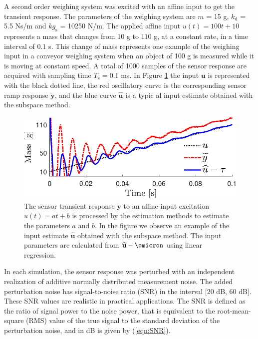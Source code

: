 A second order weighing system was excited with an affine input to get the transient response.
The parameters of the weighing system are $m$ = 15 g, $k_{\mathrm{d}}$ = 5.5 Ns/m and $kg_{\mathrm{s}}$ = 10250 N/m.
The applied affine input $u(t) = 100 t + 10$ represents a mass that changes from $10$ g to $110$ g, at a constant rate, in a time interval of $0.1$ s.
This change of mass represents one example of the weighing input in a conveyor weighing system when an object of 100 g is measured while it is moving at constant speed.
A total of 1000 samples of the sensor response are acquired with sampling time $T_s = 0.1$ ms.
In Figure \ref{fig:sensor_weight} the input $\mathbf{u}$ is represented with the black dotted line, the red oscillatory curve is the corresponding sensor ramp response $\widetilde{\mathbf{y}}$, and the blue curve $\widehat{\mathbf{u}}_{\mathrm{}}$ is a typic al input estimate obtained with the subspace method.


\begin{figure}[!htbp]
\centering
\includegraphics[width=0.69\columnwidth]{./ChapterRampInput/fig/Fig_2.pdf} 
\caption{ \label{fig:sensor_weight} The sensor transient response $\widetilde{\mathbf{y}}$ to an affine input excitation $u(t) = at+b$ is processed by the estimation methods to estimate the parameters $a$ and $b$. In the figure we observe an example of the input estimate $\widehat{\mathbf{u}}$ obtained with the subspace method. The input parameters are calculated from $\widehat{\mathbf{u}} - \omicron$ using linear regression.}
\end{figure}

In each simulation, the sensor response was perturbed with an independent realization of additive normally distributed measurement noise.
The added perturbation noise has signal-to-noise ratio (SNR) in the interval [20 dB, 60 dB].
These SNR values are realistic in practical applications.
The SNR is defined as the ratio of signal power to the noise power, that is equivalent to the root-mean-square (RMS) value of the true signal to the standard deviation of the perturbation noise, and in dB is given by \color{blue}(\ref{eqn:SNR})\color{black}.


